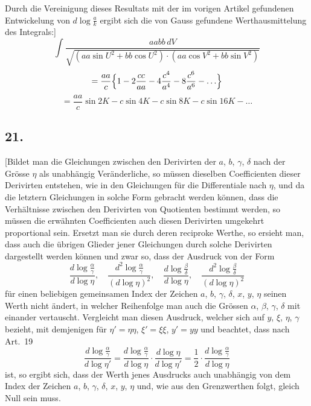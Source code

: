 \documentclass[10pt,a4paper]{article}
\begin{document}
Durch die Vereinigung dieses Resultats mit der im vorigen Artikel gefundenen Entwickelung von $d\log\frac{a}{k}$ ergibt sich die von Gauss gefundene Werthausmittelung des Integrals:]
\[
\int\!\frac{aabb\,dV}{\sqrt{(aa\sin U^2+bb\cos U^2)\cdot(aa\cos V^2+bb\sin V^2)}}
\]
\[
= \frac{aa}{c}\Bigl\{1 - 2\frac{cc}{aa} - 4\frac{c^4}{a^4} - 8\frac{c^6}{a^6} - \ldots\Bigr\}
\]
\[
= \frac{aa}{c}\sin 2K - c\sin 4K - c\sin 8K - c\sin 16K - \ldots
\]


\subsection*{21.}

[Bildet man die Gleichungen zwischen den Derivirten der $a$, $b$, $\gamma$, $\delta$ nach
der Grösse $\eta$ als unabhängig Veränderliche, so müssen dieselben Coefficienten
dieser Derivirten entstehen, wie in den Gleichungen für die Differentiale nach $\eta$,
und da die letztern Gleichungen in solche Form gebracht werden können, dass
die Verhältnisse zwischen den Derivirten von Quotienten bestimmt werden, so
müssen die erwähnten Coefficienten auch diesen Derivirten umgekehrt proportional sein. Ersetzt man sie durch deren reciproke Werthe, so ersieht man, dass
auch die übrigen Glieder jener Gleichungen durch solche Derivirten dargestellt
werden können und zwar so, dass der Ausdruck von der Form
\[
\frac{d\log\frac{\alpha}{\gamma}}{d\log\eta}, \quad
\frac{d^2\log\frac{\alpha}{\gamma}}{(d\log\eta)^2}, \quad
\frac{d\log\frac{\beta}{\delta}}{d\log\eta}, \quad
\frac{d^2\log\frac{\beta}{\delta}}{(d\log\eta)^2}
\]
für einen beliebigen gemeinsamen Index der Zeichen $a$, $b$, $\gamma$, $\delta$, $x$, $y$, $\eta$ seinen
Werth nicht ändert, in welcher Reihenfolge man auch die Grössen $\alpha$, $\beta$, $\gamma$, $\delta$
mit einander vertauscht. Vergleicht man diesen Ausdruck, welcher sich auf
$y$, $\xi$, $\eta$, $\gamma$ bezieht, mit demjenigen für $\eta'=\eta\eta$, $\xi'=\xi\xi$, $y'=yy$ und
beachtet, dass nach Art.~19
\[
\frac{d\log\frac{\alpha}{\gamma}}{d\log\eta'} = \frac{d\log\frac{\alpha}{\gamma}}{d\log\eta}\cdot\frac{d\log\eta}{d\log\eta'}
= \frac12 \cdot \frac{d\log\frac{\alpha}{\gamma}}{d\log\eta}
\]
ist, so ergibt sich, dass der Werth jenes Ausdrucks auch unabhängig von dem
Index der Zeichen $a$, $b$, $\gamma$, $\delta$, $x$, $y$, $\eta$ und, wie aus den Grenzwerthen folgt, gleich
Null sein muss.
\end{document}
